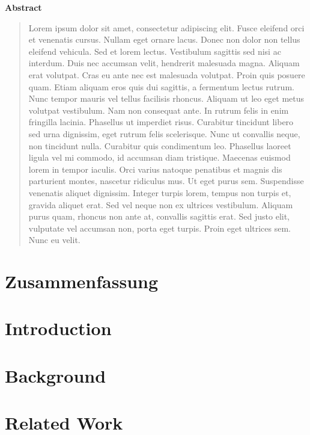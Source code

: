 \documentclass[12pt]{scrbook}
\newcommand{\abstractname}{Abstract}
\newenvironment{abstract}{
    \begin{center}
    \bfseries \abstractname
    \end{center}
    \begin{quote}
}{
    \end{quote}
}
\begin{document}
\begin{abstract}
    Lorem ipsum dolor sit amet, consectetur adipiscing elit. Fusce eleifend orci
    et venenatis cursus. Nullam eget ornare lacus. Donec non dolor non tellus
    eleifend vehicula. Sed et lorem lectus. Vestibulum sagittis sed nisi ac interdum.
    Duis nec accumsan velit, hendrerit malesuada magna. Aliquam erat volutpat.
    Cras eu ante nec est malesuada volutpat. Proin quis posuere quam. Etiam aliquam
    eros quis dui sagittis, a fermentum lectus rutrum. Nunc tempor mauris vel tellus
    facilisis rhoncus. Aliquam ut leo eget metus volutpat vestibulum.
    Nam non consequat ante. In rutrum felis in enim fringilla lacinia.
    Phasellus ut imperdiet risus. Curabitur tincidunt libero sed urna dignissim,
    eget rutrum felis scelerisque. Nunc ut convallis neque, non tincidunt nulla.
    Curabitur quis condimentum leo. Phasellus laoreet ligula vel mi commodo, id
    accumsan diam tristique. Maecenas euismod lorem in tempor iaculis.
    Orci varius natoque penatibus et magnis dis parturient montes, nascetur
    ridiculus mus. Ut eget purus sem. Suspendisse venenatis aliquet dignissim.
    Integer turpis lorem, tempus non turpis et, gravida aliquet erat. Sed vel
    neque non ex ultrices vestibulum. Aliquam purus quam, rhoncus non ante at,
    convallis sagittis erat. Sed justo elit, vulputate vel accumsan non, porta eget
    turpis. Proin eget ultrices sem. Nunc eu velit.
\end{abstract}
\thispagestyle{empty}

\chapter*{Zusammenfassung}

\thispagestyle{empty}

\tableofcontents


\chapter{Introduction}


\chapter{Background}


\chapter{Related Work}


\printbibliography
\end{document}
